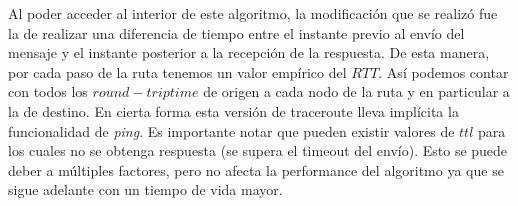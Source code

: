 \indent Al poder acceder al interior de este algoritmo, la modificación que se realizó fue la de realizar una diferencia de tiempo entre el instante previo al envío del mensaje y el instante posterior a la recepción de la respuesta. De esta manera, por cada paso de la ruta tenemos un valor empírico del $RTT$. Así podemos contar con todos los $round-trip time$ de origen a cada nodo de la ruta y en particular a la de destino. En cierta forma esta versión de traceroute lleva implícita la funcionalidad de \textsl{ping}. Es importante notar que pueden existir valores de $ttl$ para los cuales no se obtenga respuesta (se supera el timeout del envío). Esto se puede deber a múltiples factores, pero no afecta la performance del algoritmo ya que se sigue adelante con un tiempo de vida mayor.\\
